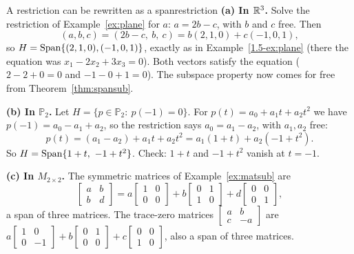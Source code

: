 \documentclass[11pt]{article}
\begin{document}
\begin{exmp}{A restriction can be rewritten as a span}{restriction}
\textbf{(a) In $\mathbb{R}^3$.} Solve the restriction of Example~\ref{ex:plane} for $a$: $a=2b-c$, with $b$ and $c$ free. Then
\[
(a,b,c)=(2b-c,\ b,\ c)=b(2,1,0)+c(-1,0,1),
\]
so $H=\operatorname{Span}\{(2,1,0),(-1,0,1)\}$, exactly as in Example~\ref{1.5-ex:plane} (there the equation was $x_1-2x_2+3x_3=0$). Both vectors satisfy the equation ($2-2+0=0$ and $-1-0+1=0$). The subspace property now comes for free from Theorem~\ref{thm:spansub}.

\textbf{(b) In $\mathbb{P}_2$.} Let $H=\{p\in\mathbb{P}_2:\ p(-1)=0\}$. For $p(t)=a_0+a_1t+a_2t^2$ we have $p(-1)=a_0-a_1+a_2$, so the restriction says $a_0=a_1-a_2$, with $a_1,a_2$ free:
\[
p(t)=(a_1-a_2)+a_1t+a_2t^2=a_1(1+t)+a_2(-1+t^2).
\]
So $H=\operatorname{Span}\{1+t,\ -1+t^2\}$. Check: $1+t$ and $-1+t^2$ vanish at $t=-1$.

\textbf{(c) In $M_{2\times2}$.} The symmetric matrices of Example~\ref{ex:matsub} are
\[
\begin{bmatrix}a&b\\b&d\end{bmatrix}=a\begin{bmatrix}1&0\\0&0\end{bmatrix}+b\begin{bmatrix}0&1\\1&0\end{bmatrix}+d\begin{bmatrix}0&0\\0&1\end{bmatrix},
\]
a span of three matrices. The trace-zero matrices $\begin{bmatrix}a&b\\c&-a\end{bmatrix}$ are
$a\begin{bmatrix}1&0\\0&-1\end{bmatrix}+b\begin{bmatrix}0&1\\0&0\end{bmatrix}+c\begin{bmatrix}0&0\\1&0\end{bmatrix}$, also a span of three matrices.
\end{exmp}
\end{document}
